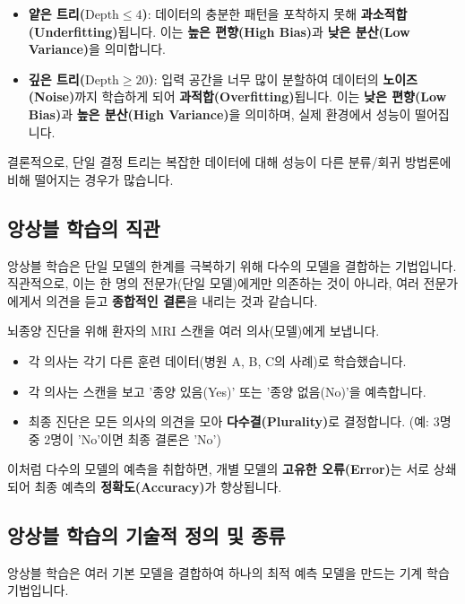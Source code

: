 \documentclass[11pt,a4paper]{book}
\theoremstyle{definition}
\begin{document}
\begin{itemize}
    \item \textbf{얕은 트리($\text{Depth} \le 4$)}: 데이터의 충분한 패턴을 포착하지 못해 \textbf{과소적합(Underfitting)}됩니다. 이는 \textbf{높은 편향(High Bias)}과 \textbf{낮은 분산(Low Variance)}을 의미합니다.
    \item \textbf{깊은 트리($\text{Depth} \ge 20$)}: 입력 공간을 너무 많이 분할하여 데이터의 \textbf{노이즈(Noise)}까지 학습하게 되어 \textbf{과적합(Overfitting)}됩니다. 이는 \textbf{낮은 편향(Low Bias)}과 \textbf{높은 분산(High Variance)}을 의미하며, 실제 환경에서 성능이 떨어집니다.
\end{itemize}

결론적으로, 단일 결정 트리는 복잡한 데이터에 대해 성능이 다른 분류/회귀 방법론에 비해 떨어지는 경우가 많습니다.

\subsection{앙상블 학습의 직관}

앙상블 학습은 단일 모델의 한계를 극복하기 위해 다수의 모델을 결합하는 기법입니다.
직관적으로, 이는 한 명의 전문가(단일 모델)에게만 의존하는 것이 아니라, 여러 전문가에게서 의견을 듣고 \textbf{종합적인 결론}을 내리는 것과 같습니다.

\begin{examplebox}[title={현실 비유: MRI 진단}]
뇌종양 진단을 위해 환자의 MRI 스캔을 여러 의사(모델)에게 보냅니다.
\begin{itemize}
    \item 각 의사는 각기 다른 훈련 데이터(병원 A, B, C의 사례)로 학습했습니다.
    \item 각 의사는 스캔을 보고 '종양 있음(Yes)' 또는 '종양 없음(No)'을 예측합니다.
    \item 최종 진단은 모든 의사의 의견을 모아 \textbf{다수결(Plurality)}로 결정합니다. (예: 3명 중 2명이 'No'이면 최종 결론은 'No')
\end{itemize}
이처럼 다수의 모델의 예측을 취합하면, 개별 모델의 \textbf{고유한 오류(Error)}는 서로 상쇄되어 최종 예측의 \textbf{정확도(Accuracy)}가 향상됩니다.
\end{examplebox}

\subsection{앙상블 학습의 기술적 정의 및 종류}

앙상블 학습은 여러 기본 모델을 결합하여 하나의 최적 예측 모델을 만드는 기계 학습 기법입니다.
\end{document}
